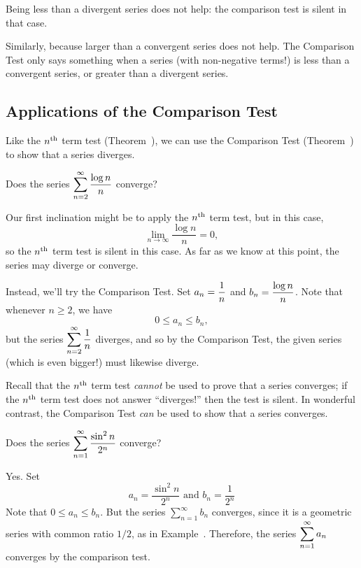 \begin{warning}
  Being less than a divergent series does not help: the comparison
  test is silent in that case.

  Similarly, because larger than a convergent series does not help.
  The Comparison Test only says something when a series (with non-negative terms!) is less than a
  convergent series, or greater than a divergent series.
\end{warning}

\subsection{Applications of the Comparison Test}

Like the $n^{\mbox{\scriptsize th}}$ term test (Theorem~), we
can use the Comparison Test (Theorem~) to
show that a series diverges.

\begin{example}
Does the series $\displaystyle\sum_{n=2}^\infty \displaystyle\frac{\log n}{n}$ converge?
\end{example}

\begin{example}
Our first inclination might be to apply the $n^{\mbox{\scriptsize th}}$ term test, but in this case,
$$
\lim_{n \to \infty} \frac{\log n}{n} = 0,
$$
so the $n^{\mbox{\scriptsize th}}$ term test is silent in this case.  As far as we know
at this point, the series may diverge or converge.

Instead, we'll try the Comparison Test.  Set $a_n = \displaystyle\frac{1}{n}$ and $b_n = \displaystyle\frac{\log n}{n}$.  Note that whenever $n \geq 2$, we have
$$
0 \leq a_n \leq b_n,
$$
but the series $\displaystyle\sum_{n=2}^\infty \frac{1}{n}$ diverges, and so by
the Comparison Test, the given series (which is even bigger!) must
likewise diverge.
\end{example}

Recall that the $n^{\mbox{\scriptsize th}}$ term test \textit{cannot} be used to prove that a series converges; if the $n^{\mbox{\scriptsize th}}$ term test does not answer ``diverges!'' then the test is silent.  In wonderful contrast, the Comparison Test \textit{can} be used to show that a series converges.

\begin{example}
Does the series $\displaystyle\sum_{n=1}^\infty \displaystyle\frac{\sin^2 n}{2^n}$ converge?
\end{example}

\begin{example}
Yes.  Set
$$
a_n = \frac{\sin^2 n}{2^n} \mbox{ and } b_n = \frac{1}{2^n}
$$
Note that $0 \leq a_n \leq b_n$.  But the series $\sum_{n=1}^\infty
b_n$ converges, since it is a geometric series with common ratio
$1/2$, as in Example~.  Therefore,
the series $\displaystyle\sum_{n=1}^\infty a_n$ converges by the comparison
test.
\end{example}

